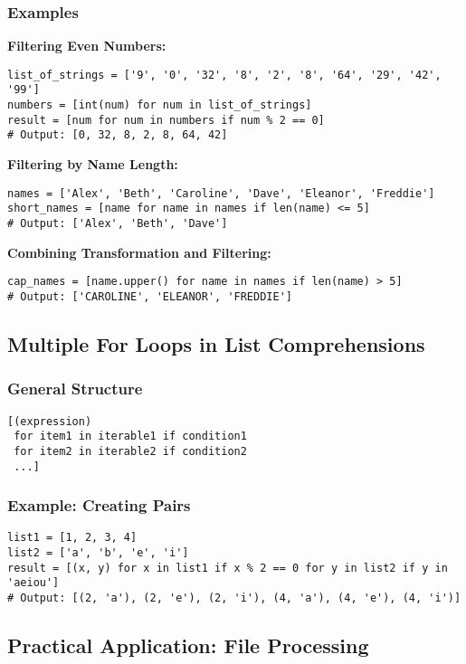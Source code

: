 \documentclass[12pt,a4paper]{article}
\begin{document}
\subsubsection{Examples}

\textbf{Filtering Even Numbers:}
\begin{lstlisting}
list_of_strings = ['9', '0', '32', '8', '2', '8', '64', '29', '42', '99']
numbers = [int(num) for num in list_of_strings]
result = [num for num in numbers if num % 2 == 0]
# Output: [0, 32, 8, 2, 8, 64, 42]
\end{lstlisting}

\textbf{Filtering by Name Length:}
\begin{lstlisting}
names = ['Alex', 'Beth', 'Caroline', 'Dave', 'Eleanor', 'Freddie']
short_names = [name for name in names if len(name) <= 5]
# Output: ['Alex', 'Beth', 'Dave']
\end{lstlisting}

\textbf{Combining Transformation and Filtering:}
\begin{lstlisting}
cap_names = [name.upper() for name in names if len(name) > 5]
# Output: ['CAROLINE', 'ELEANOR', 'FREDDIE']
\end{lstlisting}

\subsection{Multiple For Loops in List Comprehensions}

\subsubsection{General Structure}
\begin{lstlisting}
[(expression) 
 for item1 in iterable1 if condition1 
 for item2 in iterable2 if condition2
 ...]
\end{lstlisting}

\subsubsection{Example: Creating Pairs}
\begin{lstlisting}
list1 = [1, 2, 3, 4]
list2 = ['a', 'b', 'e', 'i']
result = [(x, y) for x in list1 if x % 2 == 0 for y in list2 if y in 'aeiou']
# Output: [(2, 'a'), (2, 'e'), (2, 'i'), (4, 'a'), (4, 'e'), (4, 'i')]
\end{lstlisting}

\subsection{Practical Application: File Processing}
\end{document}
